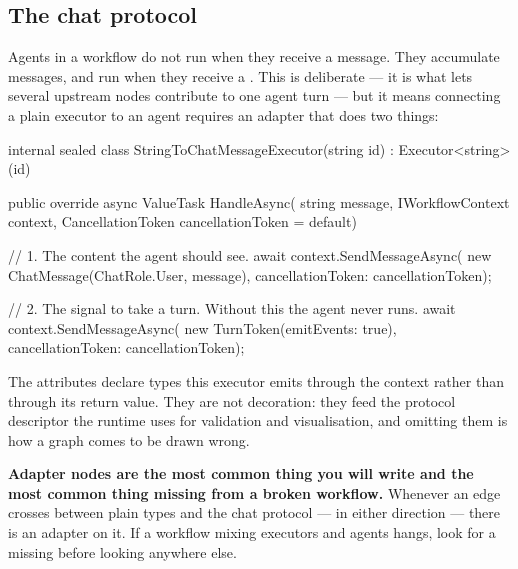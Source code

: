 \subsection{The chat protocol}
\label{sec:wf-chat-protocol}

Agents in a workflow do not run when they receive a message. They accumulate
messages, and run when they receive a . This is deliberate --- it
is what lets several upstream nodes contribute to one agent turn --- but it means
connecting a plain executor to an agent requires an adapter that does two things:

\begin{csharp}
internal sealed class StringToChatMessageExecutor(string id) : Executor<string>(id)
{
    public override async ValueTask HandleAsync(
        string message,
        IWorkflowContext context,
        CancellationToken cancellationToken = default)
    {
        // 1. The content the agent should see.
        await context.SendMessageAsync(
            new ChatMessage(ChatRole.User, message),
            cancellationToken: cancellationToken);

        // 2. The signal to take a turn. Without this the agent never runs.
        await context.SendMessageAsync(
            new TurnToken(emitEvents: true),
            cancellationToken: cancellationToken);
    }
}
\end{csharp}

The  attributes declare types this executor emits through the
context rather than through its return value. They are not decoration: they feed
the protocol descriptor the runtime uses for validation and visualisation, and
omitting them is how a graph comes to be drawn wrong.

\begin{note}
\textbf{Adapter nodes are the most common thing you will write and the most
common thing missing from a broken workflow.} Whenever an edge crosses between
plain types and the chat protocol --- in either direction --- there is an adapter
on it. If a workflow mixing executors and agents hangs, look for a missing
 before looking anywhere else.
\end{note}

